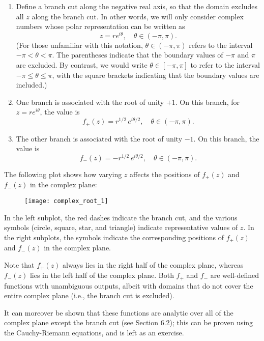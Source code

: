 \documentclass[10pt,a4paper]{article}
\begin{document}
\begin{enumerate}
\item Define a branch cut along the negative real axis, so that the
  domain excludes all $z$ along the branch cut. In other words, we
  will only consider complex numbers whose polar representation can be
  written as $$z = r e^{i\theta}, \quad \theta \in (-\pi, \pi).$$ (For
  those unfamiliar with this notation, $\theta \in (-\pi, \pi)$ refers
  to the interval $-\pi < \theta < \pi$.  The parentheses indicate
  that the boundary values of $-\pi$ and $\pi$ are excluded.  By
  contrast, we would write $\theta \in [-\pi, \pi]$ to refer to the
  interval $-\pi \le \theta \le \pi$, with the square brackets
  indicating that the boundary values are included.)

\item One branch is associated with the root of unity $+1$. On this
  branch, for $z = re^{i\theta}$, the value is $$f_+(z) = r^{1/2} \,
  e^{i\theta/2}, \quad \theta \in (-\pi, \pi).$$

\item The other branch is associated with the root of unity $-1$. On
  this branch, the value is $$f_-(z) = -r^{1/2} \, e^{i\theta/2},
  \quad \theta \in (-\pi, \pi).$$
\end{enumerate}

\noindent
The following plot shows how varying $z$ affects the positions of
$f_+(z)$ and $f_-(z)$ in the complex plane:

\begin{figure}[h]
  \centering\texttt{[image: complex\_root\_1]}
\end{figure}

\noindent
In the left subplot, the red dashes indicate the branch cut, and the
various symbols (circle, square, star, and triangle) indicate
representative values of $z$.  In the right subplots, the symbols
indicate the corresponding positions of $f_+(z)$ and $f_-(z)$ in the
complex plane.

Note that $f_+(z)$ always lies in the right half of the complex plane,
whereas $f_-(z)$ lies in the left half of the complex plane. Both
$f_+$ and $f_-$ are well-defined functions with unambiguous outputs,
albeit with domains that do not cover the entire complex plane (i.e.,
the branch cut is excluded).

It can moreover be shown that these functions are analytic over all of
the complex plane except the branch cut (see Section 6.2); this can be
proven using the Cauchy-Riemann equations, and is left as an exercise.
\end{document}
